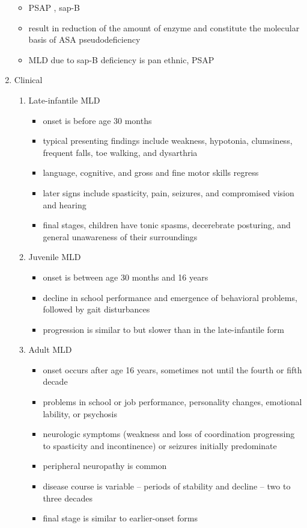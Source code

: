 \documentclass{scrartcl}
\begin{document}
\begin{enumerate}
\begin{itemize}
\item PSAP , sap-B
\item result in reduction of the amount of enzyme and constitute the molecular basis of ASA pseudodeficiency
\item MLD due to sap-B deficiency is pan ethnic, PSAP
\end{itemize}

\item Clinical
\label{sec:orga64e258}
\begin{enumerate}
\item Late-infantile MLD
\label{sec:orgd5c60ea}
\begin{itemize}
\item onset is before age 30 months
\item typical presenting findings include weakness, hypotonia, clumsiness, frequent falls, toe walking, and dysarthria
\item language, cognitive, and gross and fine motor skills regress
\item later signs include spasticity, pain, seizures, and compromised vision and hearing
\item final stages, children have tonic spasms, decerebrate posturing, and
general unawareness of their surroundings
\end{itemize}

\item Juvenile MLD
\label{sec:orgc3fb600}
\begin{itemize}
\item onset is between age 30 months and 16 years
\item decline in school performance and emergence of behavioral problems, followed by gait disturbances
\item progression is similar to but slower than in the late-infantile form
\end{itemize}

\item Adult MLD
\label{sec:org3516bbc}
\begin{itemize}
\item onset occurs after age 16 years, sometimes not until the fourth or fifth decade
\item problems in school or job performance, personality changes, emotional lability, or psychosis
\item neurologic symptoms (weakness and loss of coordination progressing
to spasticity and incontinence) or seizures initially
predominate
\item peripheral neuropathy is common
\item disease course is variable – periods of stability and decline – two to three decades
\item final stage is similar to earlier-onset forms
\end{itemize}
\end{enumerate}


\end{enumerate}
\end{document}
